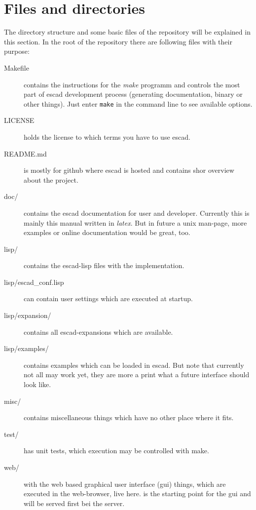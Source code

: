 \documentclass[a4paper, 12pt, openany]{scrbook}
\begin{document}
\section{Files and directories}
The directory structure and some basic files of the repository will be explained in this section. In the root of the repository there are following files with their purpose:
\begin{description}
\item[Makefile] contains the instructions for the \emph{make} programm and controls the most part of escad development process (generating documentation, binary or other things). Just enter \texttt{make} in the command line to see available options.
\item[LICENSE] holds the license to which terms you have to use escad.
\item[README.md] is mostly for github where escad is hosted and contains shor overview about the project.
\item[doc/] contains the escad documentation for user and developer. Currently this is mainly this manual written in \emph{latex}. But in future a unix man-page, more examples or online documentation would be great, too.
\item[lisp/] contains the escad-lisp files with the implementation.
\item[lisp/escad\_conf.lisp] can contain user settings which are executed at startup.
\item[lisp/expansion/] contains all escad-expansions which are available.
\item[lisp/examples/] contains examples which can be loaded in escad. But note that currently not all may work yet, they are more a print what a future interface should look like.
\item[misc/] contains miscellaneous things which have no other place where it fits.
\item[test/] has unit tests, which execution may be controlled with make.
\item[web/] with the web based graphical user interface (gui) things, which are executed in the web-browser, live here.  is the starting point for the gui and will be served first bei the server.
\end{description}
\end{document}
